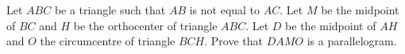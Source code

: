 Let $ABC$ be a triangle such that $AB$ is not equal to $AC$. Let $M$ be the midpoint of $BC$ and $H$ be the orthocenter of triangle $ABC$. Let $D$ be the midpoint of $AH$ and $O$ the circumcentre of triangle $BCH$. Prove that $DAMO$ is a parallelogram.